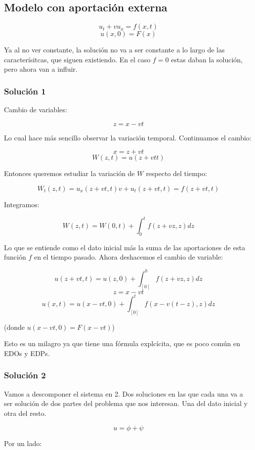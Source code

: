 	\subsection{Modelo con aportación externa}

		$$u_t + vu_x = f(x,t)$$
		$$u(x,0) = F(x)$$

		Ya al no ver constante, la solución no va a ser constante a lo largo de las caracterísitcas, que siguen existiendo. En el caso $f = 0$ estas daban la solución, pero ahora van a influir.

		\subsubsection{Solución 1}

			Cambio de variables:

			$$z = x-vt$$

			Lo cual hace más sencillo observar la variación temporal. Continuamos el cambio:

			$$x = z + vt$$
			$$W(z,t) = u(z+vtt)$$

			Entonces queremos estudiar la variación de $W$ respecto del tiempo:

			$$W_t(z,t) = u_x(z + vt, t)v + u_t(z+vt, t) = f(z + vt, t)$$

			Integramos:

			$$W(z,t) = W(0,t) + \int^{t}_{0} f(z+vz, z) dz $$

			Lo que se entiende como el dato inicial más la suma de las aportaciones de esta función $f$ en el tiempo pasado. Ahora deshacemos el cambio de variable:

			$$u(z + vt, t) = u(z,0) + \int^{b}_[0] f(z+vz, z) dz$$
			$$z = x-vt$$
			$$u(x,t) = u(x-vt,0)+ \int^{t}_[0] f(x-v(t-z),z) dz$$

			(donde $u(x-vt,0) = F(x-vt)$)

			Esto es un milagro ya que tiene una fórmula explcícita, que es poco común en EDOs y EDPs.

		\subsubsection{Solución 2}

			Vamos a descomponer el sistema en 2. Dos soluciones en las que cada una va a ser solución de dos partes del problema que nos interesan. Una del dato inicial y otra del resto.

			$$u = \phi + \psi$$

			Por un lado:

